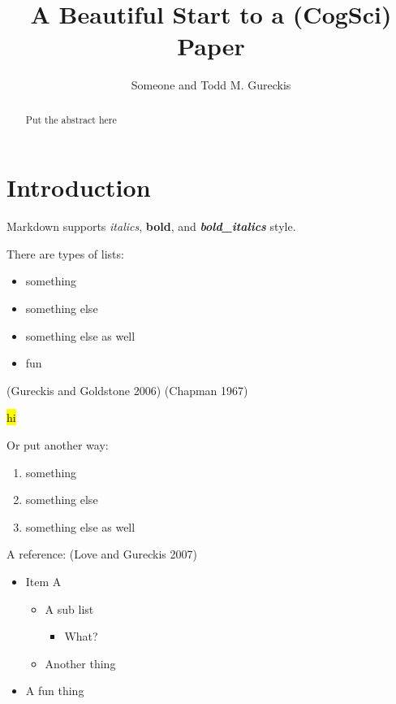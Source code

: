 \documentclass[
]{article}
\title{A Beautiful Start to a (CogSci) Paper}
\author{Someone and Todd M. Gureckis}
\date{}
\providecommand{\tightlist}{%
  \setlength{\itemsep}{0pt}\setlength{\parskip}{0pt}}
\begin{document}
\maketitle
\begin{abstract}
Put the abstract here
\end{abstract}

\hypertarget{introduction}{%
\section{Introduction}\label{introduction}}

Markdown supports \emph{italics}, \textbf{bold}, and
\textbf{\emph{bold\_italics}} style.

There are types of lists:

\begin{itemize}
\tightlist
\item
  something\\
\item
  something else\\
\item
  something else as well\\
\item
  fun
\end{itemize}

(Gureckis and Goldstone 2006) (Chapman 1967)

\hl{hi}

Or put another way:

\begin{enumerate}
\def\labelenumi{\arabic{enumi}.}
\tightlist
\item
  something\\
\item
  something else\\
\item
  something else as well
\end{enumerate}

A reference: (Love and Gureckis 2007)

\begin{itemize}
\tightlist
\item
  Item A

  \begin{itemize}
  \tightlist
  \item
    A sub list

    \begin{itemize}
    \tightlist
    \item
      What?
    \end{itemize}
  \item
    Another thing
  \end{itemize}
\item
  A fun thing
\end{itemize}
\end{document}
